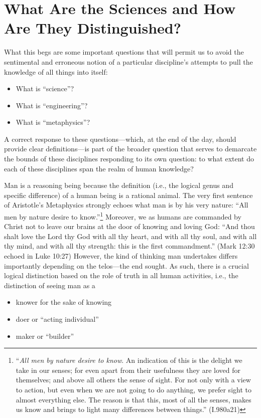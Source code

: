 \section{What Are the Sciences and How Are They Distinguished?}

What this begs are some important questions that will permit us to avoid the sentimental and erroneous notion of a particular discipline’s attempts to pull the knowledge of all things into itself:

\begin{itemize}
\item What is “science”?
\item What is “engineering”?
\item What is “metaphysics”?
\end{itemize}

A correct response to these questions—which, at the end of the day, should provide clear definitions—is part of the broader question that serves to demarcate the bounds of these disciplines responding to its own question: to what extent do each of these disciplines span the realm of human knowledge?

Man is a reasoning being because the definition (i.e., the logical genus and specific difference) of a human being is a rational animal. The very first sentence of Aristotle’s Metaphysics strongly echoes what man is by his very nature: “All men by nature desire to know.”\footnote{``\emph{All men by nature desire to know}. An indication of this is the delight we take in our senses; for even apart from their usefulness they are loved for themselves; and above all others the sense of sight. For not only with a view to action, but even when we are not going to do anything, we prefer sight to almost everything else. The reason is that this, most of all the senses, makes us know and brings to light many differences between things.'' (I.980a21)} Moreover, we as humans are commanded by Christ not to leave our brains at the door of knowing and loving God: “And thou shalt love the Lord thy God with all thy heart, and with all thy soul, and with all thy mind, and with all thy strength: this is the first commandment.” (Mark 12:30 echoed in Luke 10:27) However, the kind of thinking man undertakes differs importantly depending on the telos—the end sought. As such, there is a crucial logical distinction based on the role of truth in all human activities, i.e., the distinction of seeing man as a

\begin{itemize}
\item knower for the sake of knowing
\item doer or “acting individual”
\item maker or “builder”
\end{itemize}

